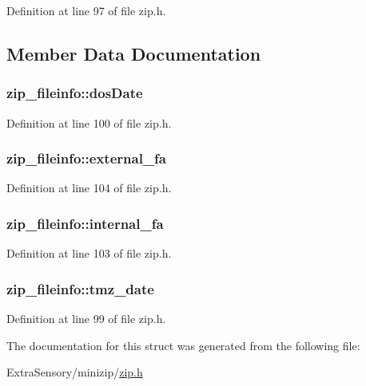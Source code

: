 Definition at line 97 of file zip.\+h.



\subsection{Member Data Documentation}
\hypertarget{structzip__fileinfo_a0541c57e59450fbc17b2f898ca4bc9e8}{
\subsubsection[{dos\+Date}]{ zip\+\_\+fileinfo\+::dos\+Date}}\label{structzip__fileinfo_a0541c57e59450fbc17b2f898ca4bc9e8}


Definition at line 100 of file zip.\+h.

\hypertarget{structzip__fileinfo_ac0be78ded330ffd46815bafc5b6b37bb}{
\subsubsection[{external\+\_\+fa}]{ zip\+\_\+fileinfo\+::external\+\_\+fa}}\label{structzip__fileinfo_ac0be78ded330ffd46815bafc5b6b37bb}


Definition at line 104 of file zip.\+h.

\hypertarget{structzip__fileinfo_a396175a434b86115ce5600ab1dbb1644}{
\subsubsection[{internal\+\_\+fa}]{ zip\+\_\+fileinfo\+::internal\+\_\+fa}}\label{structzip__fileinfo_a396175a434b86115ce5600ab1dbb1644}


Definition at line 103 of file zip.\+h.

\hypertarget{structzip__fileinfo_ae09a694a598b7507d23705764c9e46fb}{
\subsubsection[{tmz\+\_\+date}]{ zip\+\_\+fileinfo\+::tmz\+\_\+date}}\label{structzip__fileinfo_ae09a694a598b7507d23705764c9e46fb}


Definition at line 99 of file zip.\+h.



The documentation for this struct was generated from the following file\+:\begin{DoxyCompactItemize}
\item 
Extra\+Sensory/minizip/\hyperlink{zip_8h}{zip.\+h}\end{DoxyCompactItemize}
